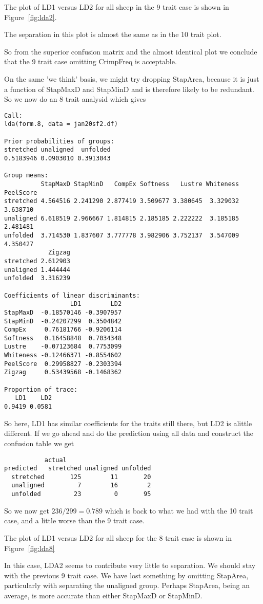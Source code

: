 \documentclass[titlepage]{article}  %
\begin{document}
The plot of LD1 versus LD2 for all sheep in the 9 trait case is shown in Figure~\ref{fig:lda2}.

The separation in this plot is almost the same as in the 10 trait plot. 

So from the superior confusion matrix and the almost identical plot we conclude that the 9 trait case omitting CrimpFreq is acceptable.

On the same 'we think' basis, we might try dropping StapArea, because it is just a function of StapMaxD and StapMinD and is therefore likely to be redundant. So we now do an 8 trait analysid which gives
\begin{verbatim}
Call:
lda(form.8, data = jan20sf2.df)

Prior probabilities of groups:
stretched unaligned  unfolded 
0.5183946 0.0903010 0.3913043 

Group means:
          StapMaxD StapMinD   CompEx Softness   Lustre Whiteness PeelScore
stretched 4.564516 2.241290 2.877419 3.509677 3.380645  3.329032  3.638710
unaligned 6.618519 2.966667 1.814815 2.185185 2.222222  3.185185  2.481481
unfolded  3.714530 1.837607 3.777778 3.982906 3.752137  3.547009  4.350427
            Zigzag
stretched 2.612903
unaligned 1.444444
unfolded  3.316239

Coefficients of linear discriminants:
                  LD1        LD2
StapMaxD  -0.18570146 -0.3907957
StapMinD  -0.24207299  0.3504842
CompEx     0.76181766 -0.9206114
Softness   0.16458848  0.7034348
Lustre    -0.07123684  0.7753099
Whiteness -0.12466371 -0.8554602
PeelScore  0.29958827 -0.2303394
Zigzag     0.53439568 -0.1468362

Proportion of trace:
   LD1    LD2 
0.9419 0.0581 
\end{verbatim}
So here, LD1 has similar coefficients for the traits still there, but LD2 is alittle different. If we go ahead and do the prediction using all data and construct the confusion table we get
\begin{verbatim}
           actual
predicted   stretched unaligned unfolded
  stretched       125        11       20
  unaligned         7        16        2
  unfolded         23         0       95
\end{verbatim}
 So we now get $236/299 = 0.789$ which is back to what we had with the 10 trait case, and a little worse than the 9 trait case.

The plot of LD1 versus LD2 for all sheep for the 8 trait case is shown in Figure~\ref{fig:lda8}

In this case, LDA2 seems to contribute very little to separation. We should stay with the previous 9 trait case. We have lost something by omitting StapArea, particularly with separating the unaligned group. Perhaps StapArea, being an average, is more accurate than either StapMaxD or StapMinD.
\end{document}
